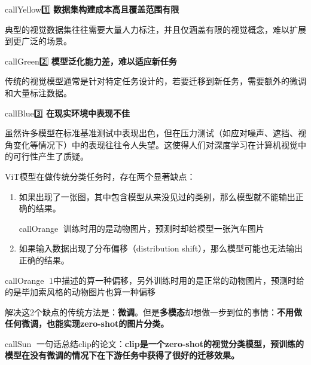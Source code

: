 \documentclass[zihao=false,fontset=windows]{ctexart}
\begin{document}
\begin{tcbraster}[raster columns=3, raster equal height=rows, raster column skip=9pt, raster row skip=8pt, raster left skip=0pt, raster right skip=0pt]
\begin{feishuboxnb}{callYellow}{1️⃣}
\textbf{数据集构建成本高且覆盖范围有限}\par
典型的视觉数据集往往需要大量人力标注，并且仅涵盖有限的视觉概念，难以扩展到更广泛的场景。\par
\end{feishuboxnb}
\begin{feishuboxnb}{callGreen}{2️⃣}
\textbf{模型泛化能力差，难以适应新任务}\par
传统的视觉模型通常是针对特定任务设计的，若要迁移到新任务，需要额外的微调和大量标注数据。\par
\end{feishuboxnb}
\begin{feishuboxnb}{callBlue}{3️⃣}
\textbf{在现实环境中表现不佳}\par
虽然许多模型在标准基准测试中表现出色，但在压力测试（如应对噪声、遮挡、视角变化等情况下）中的表现往往令人失望。这使得人们对深度学习在计算机视觉中的可行性产生了质疑。\par
\end{feishuboxnb}
\end{tcbraster}
ViT模型在做传统分类任务时，存在两个显著缺点：\par
\begin{enumerate}
\item 如果出现了一张图，其中包含模型从来没见过的类别，那么模型就不能输出正确的结果。
\begin{feishubox}{callOrange}{🌰}
训练时用的是动物图片，预测时却给模型一张汽车图片\par
\end{feishubox}
\item 如果输入数据出现了分布偏移（distribution shift），那么模型可能也无法输出正确的结果。
\end{enumerate}
\begin{feishubox}{callOrange}{🎉}
1中描述的算一种偏移，另外训练时用的是正常的动物图片，预测时给的是毕加索风格的动物图片也算一种偏移\par
\end{feishubox}
解决这2个缺点的传统方法是：\textbf{微调}。但是\textbf{多模态}却想做一步到位的事情：\textcolor{feishuRed}{\textbf{不用做任何微调，也能实现zero-shot的图片分类。}}\par
\begin{feishubox}{callSun}{🌟}
一句话总结clip的论文：\textbf{clip是一个zero-shot的视觉分类模型，预训练的模型在没有微调的情况下在下游任务中获得了很好的迁移效果。}\par
\end{feishubox}
\end{document}
